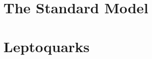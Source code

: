 \section{The Standard Model} \label{sec:StandardModel}


\section{Leptoquarks} \label{sec:Leptoquarks}
